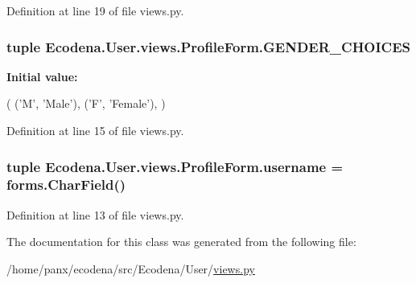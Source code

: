 Definition at line 19 of file views.py.

\hypertarget{class_ecodena_1_1_user_1_1views_1_1_profile_form_ac93f85620334a0793d3d177ea5ac43dd}{
\subsubsection[{GENDER\_\-CHOICES}]{\setlength{\rightskip}{0pt plus 5cm}tuple {\bf Ecodena.User.views.ProfileForm.GENDER\_\-CHOICES}}}
\label{db/d79/class_ecodena_1_1_user_1_1views_1_1_profile_form_ac93f85620334a0793d3d177ea5ac43dd}
{\bfseries Initial value:}
\begin{DoxyCode}
(
    ('M', 'Male'),
    ('F', 'Female'),
        )
\end{DoxyCode}


Definition at line 15 of file views.py.

\hypertarget{class_ecodena_1_1_user_1_1views_1_1_profile_form_a73dce8ef060c7cea49bc252537828cc5}{
\subsubsection[{username}]{\setlength{\rightskip}{0pt plus 5cm}tuple {\bf Ecodena.User.views.ProfileForm.username} = forms.CharField()}}
\label{db/d79/class_ecodena_1_1_user_1_1views_1_1_profile_form_a73dce8ef060c7cea49bc252537828cc5}


Definition at line 13 of file views.py.



The documentation for this class was generated from the following file:\begin{DoxyCompactItemize}
\item 
/home/panx/ecodena/src/Ecodena/User/\hyperlink{_user_2views_8py}{views.py}\end{DoxyCompactItemize}
